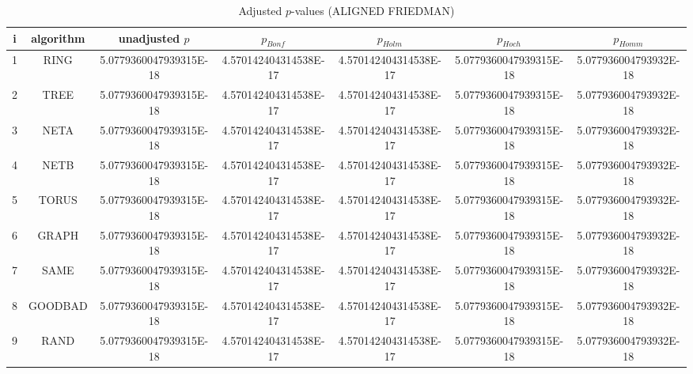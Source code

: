 \documentclass[a4paper,10pt]{article}
\begin{document}
\begin{landscape}
\begin{table}[!htp]
\centering\scriptsize
\caption{Adjusted $p$-values (ALIGNED FRIEDMAN)}
\begin{tabular}{ccccccc}
i&algorithm&unadjusted $p$&$p_{Bonf}$&$p_{Holm}$&$p_{Hoch}$&$p_{Homm}$\\
\hline
1& RING&5.0779360047939315E-18&4.570142404314538E-17&4.570142404314538E-17&5.0779360047939315E-18&5.077936004793932E-18\\
2& TREE&5.0779360047939315E-18&4.570142404314538E-17&4.570142404314538E-17&5.0779360047939315E-18&5.077936004793932E-18\\
3& NETA&5.0779360047939315E-18&4.570142404314538E-17&4.570142404314538E-17&5.0779360047939315E-18&5.077936004793932E-18\\
4& NETB&5.0779360047939315E-18&4.570142404314538E-17&4.570142404314538E-17&5.0779360047939315E-18&5.077936004793932E-18\\
5& TORUS&5.0779360047939315E-18&4.570142404314538E-17&4.570142404314538E-17&5.0779360047939315E-18&5.077936004793932E-18\\
6& GRAPH&5.0779360047939315E-18&4.570142404314538E-17&4.570142404314538E-17&5.0779360047939315E-18&5.077936004793932E-18\\
7& SAME&5.0779360047939315E-18&4.570142404314538E-17&4.570142404314538E-17&5.0779360047939315E-18&5.077936004793932E-18\\
8& GOODBAD&5.0779360047939315E-18&4.570142404314538E-17&4.570142404314538E-17&5.0779360047939315E-18&5.077936004793932E-18\\
9& RAND&5.0779360047939315E-18&4.570142404314538E-17&4.570142404314538E-17&5.0779360047939315E-18&5.077936004793932E-18\\
\hline
\end{tabular}
\end{table}


\end{landscape}
\end{document}
